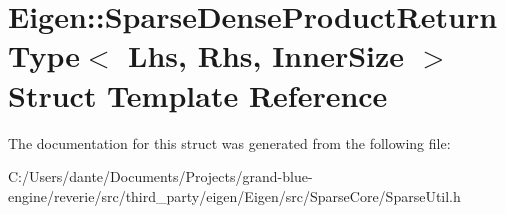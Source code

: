 \hypertarget{struct_eigen_1_1_sparse_dense_product_return_type}{}\section{Eigen\+::Sparse\+Dense\+Product\+Return\+Type$<$ Lhs, Rhs, Inner\+Size $>$ Struct Template Reference}
\label{struct_eigen_1_1_sparse_dense_product_return_type}


The documentation for this struct was generated from the following file\+:\begin{DoxyCompactItemize}
\item 
C\+:/\+Users/dante/\+Documents/\+Projects/grand-\/blue-\/engine/reverie/src/third\+\_\+party/eigen/\+Eigen/src/\+Sparse\+Core/Sparse\+Util.\+h\end{DoxyCompactItemize}
